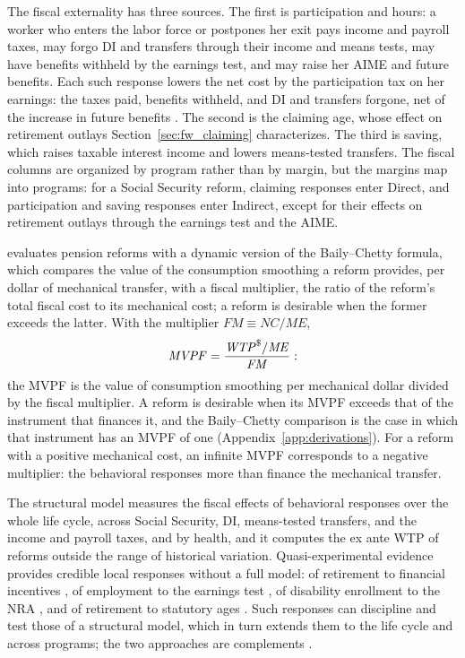 The fiscal externality has three sources. The first is participation and hours: a worker who enters the labor force or postpones her exit pays income and payroll taxes, may forgo DI and transfers through their income and means tests, may have benefits withheld by the earnings test, and may raise her AIME and future benefits. Each such response lowers the net cost by the participation tax on her earnings: the taxes paid, benefits withheld, and DI and transfers forgone, net of the increase in future benefits \citep{kleven2006marginal}. The second is the claiming age, whose effect on retirement outlays Section~\ref{sec:fw_claiming} characterizes. The third is saving, which raises taxable interest income and lowers means-tested transfers. The fiscal columns are organized by program rather than by margin, but the margins map into programs: for a Social Security reform, claiming responses enter Direct, and participation and saving responses enter Indirect, except for their effects on retirement outlays through the earnings test and the AIME.

\citet{haller2022welfare} evaluates pension reforms with a dynamic version of the Baily--Chetty formula, which compares the value of the consumption smoothing a reform provides, per dollar of mechanical transfer, with a fiscal multiplier, the ratio of the reform's total fiscal cost to its mechanical cost; a reform is desirable when the former exceeds the latter. With the multiplier $\mathit{FM}\equiv\mathit{NC}/\mathit{ME}$,
\begin{equation*}
\mathit{MVPF}=\frac{\mathit{WTP}^{\$}/\mathit{ME}}{\mathit{FM}}:
\end{equation*}
the MVPF is the value of consumption smoothing per mechanical dollar divided by the fiscal multiplier. A reform is desirable when its MVPF exceeds that of the instrument that finances it, and the Baily--Chetty comparison is the case in which that instrument has an MVPF of one (Appendix~\ref{app:derivations}). For a reform with a positive mechanical cost, an infinite MVPF corresponds to a negative multiplier: the behavioral responses more than finance the mechanical transfer.

The structural model measures the fiscal effects of behavioral responses over the whole life cycle, across Social Security, DI, means-tested transfers, and the income and payroll taxes, and by health, and it computes the ex ante WTP of reforms outside the range of historical variation. Quasi-experimental evidence provides credible local responses without a full model: of retirement to financial incentives \citep{Liebman2009labor,Manoli2016nonparametric}, of employment to the earnings test \citep{gelber2020employment}, of disability enrollment to the NRA \citep{Duggan2007aching}, and of retirement to statutory ages \citep{seibold2021reference}. Such responses can discipline and test those of a structural model, which in turn extends them to the life cycle and across programs; the two approaches are complements \citep{Chetty2009sufficient,Kleven2021sufficient}.

